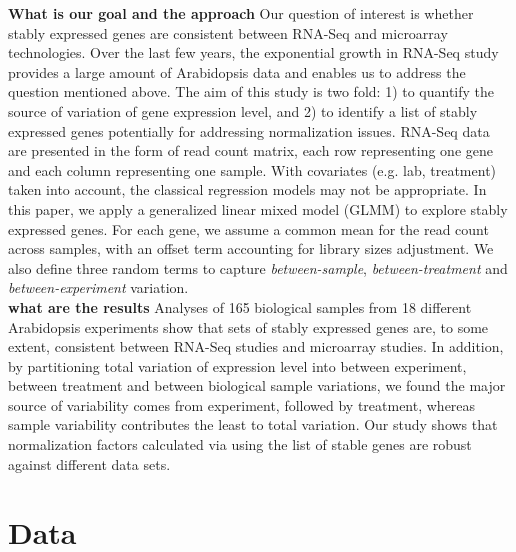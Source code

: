 \documentclass[11pt, a4paper]{article}
\begin{document}
\textbf{What is our goal and the approach}
Our question of interest is whether stably expressed genes are consistent between RNA-Seq and microarray technologies. Over the last few years,  the exponential growth in RNA-Seq study provides a large amount of Arabidopsis data and enables us to address the question mentioned above. The aim of this study is two fold: 1) to quantify the source of variation of gene expression level, and 2) to identify a list of stably expressed genes potentially for addressing normalization issues. RNA-Seq data are presented in the form of read count matrix, each row representing one gene and each column representing one sample. With covariates (e.g. lab, treatment) taken into account,  the classical regression models may not be appropriate. In this paper, we apply a generalized linear mixed model (GLMM)\citep{mccullagh1989generalized} to explore stably expressed genes. For each gene,  we assume a common mean for the read count across samples, with an offset term accounting for library sizes adjustment. We also define three random terms to capture \textit{between-sample}, \textit{between-treatment} and \textit{between-experiment} variation. \\ 
 
 \textbf{what are the results}
Analyses of 165 biological samples from 18 different Arabidopsis experiments show that sets of stably expressed genes are, to some extent, consistent between RNA-Seq studies and microarray studies. In addition, by partitioning total variation of expression level into between experiment, between treatment and between biological sample variations, we found the major source of variability comes from experiment, followed by treatment, whereas sample variability contributes the least to total variation.  Our study shows that normalization factors calculated via  \cite{anders2010differential} using the list of stable genes are robust against different data sets. 

\section{Data}
\end{document}
